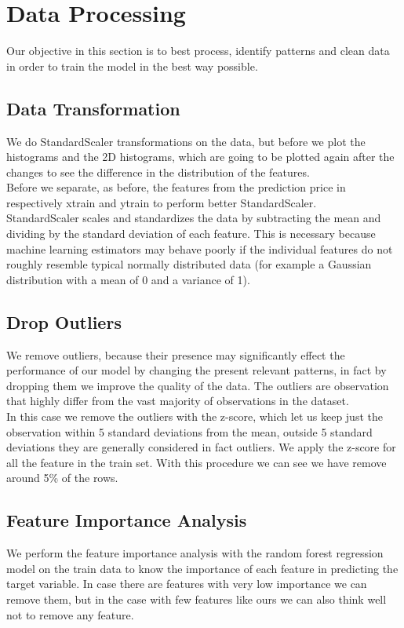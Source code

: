 \documentclass[10pt, notitlepage]{article}
\begin{document}
\color{blue}
\section{Data Processing}
\color{black}
Our objective in this section is to best process, identify patterns and clean data in order to train the model in the best way possible. 

\color{blue}
\subsection{Data Transformation}
\color{black}
We do StandardScaler transformations on the data, but before we plot the histograms and the 2D histograms, which are going to be plotted again after the changes to see the difference in the distribution of the features. 
\\
Before we separate, as before, the features from the prediction price in respectively x\textunderscore train and y\textunderscore train to perform better StandardScaler. 
\\
StandardScaler scales and standardizes the data by subtracting the mean and dividing by the standard deviation of each feature. This is necessary because machine learning estimators may behave poorly if the individual features do not roughly resemble typical normally distributed data (for example a Gaussian distribution with a mean of 0 and a variance of 1).

\color{blue}
\subsection{Drop Outliers}
\color{black}
We remove outliers, because their presence may significantly effect the performance of our model by changing the present relevant patterns, in fact by dropping them we improve the quality of the data. The outliers are observation that highly differ from the vast majority of observations in the dataset.
\\
In this case we remove the outliers with the z-score, which let us keep just the observation within 5 standard deviations from the mean, outside 5 standard deviations they are generally considered in fact outliers. We apply the z-score for all the feature in the train set. With this procedure we can see we have remove around 5\% of the rows. 

\color{blue}
\subsection{Feature Importance Analysis}
\color{black}
We perform the feature importance analysis with the random forest regression model on the train data to know the importance of each feature in predicting the target variable. In case there are features with very low importance we can remove them, but in the case with few features like ours we can also think well not to remove any feature.
\end{document}
